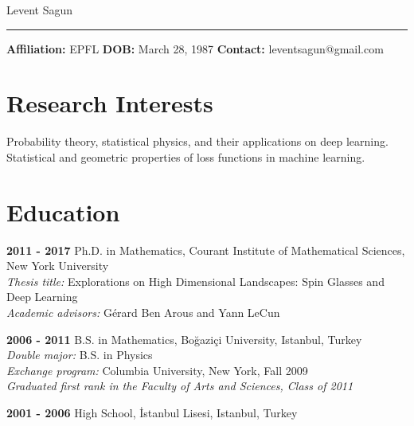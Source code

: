 \documentclass[10pt,letterpaper]{article}
\renewenvironment{itemize}
{
\begin{list}{}{\setlength{\leftmargin}{1.5em}}
}
{
  \end{list}
}
\begin{document}
{\huge Levent Sagun}

\noindent\rule{6.7in}{0.4pt}

\textbf{ Affiliation:} EPFL \textbf{ DOB:} March 28, 1987 \textbf{ Contact:} leventsagun@gmail.com

\section*{Research Interests}
\begin{itemize}
\item Probability theory, statistical physics, and their applications on deep learning. \\ Statistical and geometric properties of loss functions in machine learning.
\end{itemize}

\section*{Education}
\begin{itemize}
\item \textbf{2011 - 2017 } Ph.D. in Mathematics, Courant Institute of Mathematical Sciences, New York University \\ 
  \hspace*{2cm} \textit{ Thesis title: }{Explorations on High Dimensional Landscapes: Spin Glasses and Deep Learning} \\
  \hspace*{2cm} \textit{ Academic advisors: }{G\'erard Ben Arous and Yann LeCun}

\item \textbf{2006 - 2011 } B.S. in Mathematics, Bo\u{g}azi\c{c}i University, Istanbul, Turkey \\
    \hspace*{2cm} \textit{ Double major:} B.S. in Physics \\ 
    \hspace*{2cm} \textit{ Exchange program: }{Columbia University, New York, Fall 2009} \\ %
    \hspace*{2cm} \textit{ Graduated first rank in the Faculty of Arts and Sciences, Class of 2011}
 
\item \textbf{2001 - 2006 } High School, \.{I}stanbul Lisesi, Istanbul, Turkey%

\end{itemize}
\end{document}
